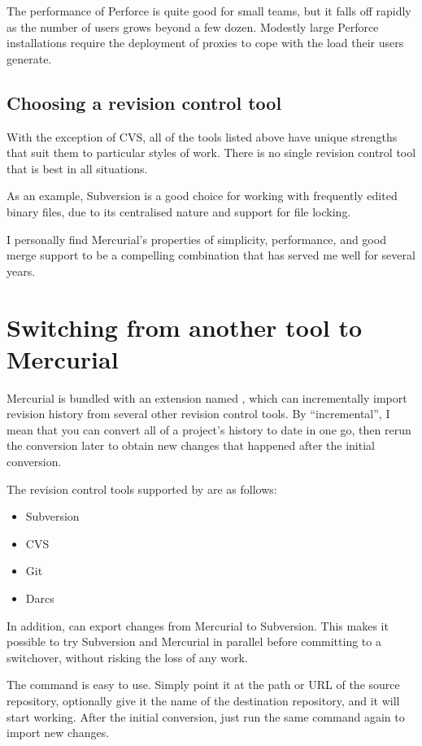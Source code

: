 The performance of Perforce is quite good for small teams, but it
falls off rapidly as the number of users grows beyond a few dozen.
Modestly large Perforce installations require the deployment of
proxies to cope with the load their users generate.


\subsection{Choosing a revision control tool}

With the exception of CVS, all of the tools listed above have unique
strengths that suit them to particular styles of work.  There is no
single revision control tool that is best in all situations.

As an example, Subversion is a good choice for working with frequently
edited binary files, due to its centralised nature and support for
file locking.

I personally find Mercurial's properties of simplicity, performance,
and good merge support to be a compelling combination that has served
me well for several years.


\section{Switching from another tool to Mercurial}

Mercurial is bundled with an extension named , which
can incrementally import revision history from several other revision
control tools.  By ``incremental'', I mean that you can convert all of
a project's history to date in one go, then rerun the conversion later
to obtain new changes that happened after the initial conversion.

The revision control tools supported by  are as
follows:
\begin{itemize}
\item Subversion
\item CVS
\item Git
\item Darcs
\end{itemize}

In addition,  can export changes from Mercurial to
Subversion.  This makes it possible to try Subversion and Mercurial in
parallel before committing to a switchover, without risking the loss
of any work.

The  command is easy to use.  Simply point it
at the path or URL of the source repository, optionally give it the
name of the destination repository, and it will start working.  After
the initial conversion, just run the same command again to import new
changes.


